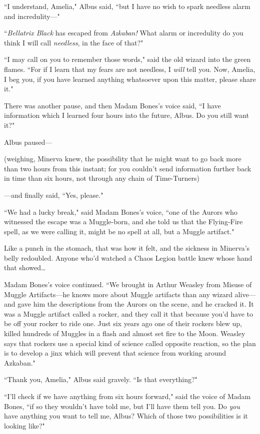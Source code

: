 ``I understand, Amelia," Albus said, ``but I have no wish to spark needless alarm and incredulity---"

``\emph{Bellatrix Black} has escaped from \emph{Azkaban!} What alarm or incredulity do you think I will call \emph{needless}, in the face of that?"

``I may call on you to remember those words," said the old wizard into the green flames. ``For if I learn that my fears are not needless, I \emph{will} tell you. Now, Amelia, I beg you, if you have learned anything whatsoever upon this matter, please share it."

There was another pause, and then Madam Bones's voice said, ``I have information which I learned four hours into the future, Albus. Do you still want it?"

Albus paused---

(weighing, Minerva knew, the possibility that he might want to go back more than two hours from this instant; for you couldn't send information further back in time than six hours, not through any chain of Time-Turners)

---and finally said, ``Yes, please."

``We had a lucky break," said Madam Bones's voice, ``one of the Aurors who witnessed the escape was a Muggle-born, and she told us that the Flying-Fire spell, as we were calling it, might be no spell at all, but a Muggle artifact."

Like a punch in the stomach, that was how it felt, and the sickness in Minerva's belly redoubled. Anyone who'd watched a Chaos Legion battle knew whose hand that showed{\ldots}

Madam Bones's voice continued. ``We brought in Arthur Weasley from Misuse of Muggle Artifacts---he knows more about Muggle artifacts than any wizard alive---and gave him the descriptions from the Aurors on the scene, and he cracked it. It was a Muggle artifact called a rocker, and they call it that because you'd have to be off your rocker to ride one. Just six years ago one of their rockers blew up, killed hundreds of Muggles in a flash and almost set fire to the Moon. Weasley says that rockers use a special kind of science called opposite reaction, so the plan is to develop a jinx which will prevent that science from working around Azkaban."

``Thank you, Amelia," Albus said gravely. ``Is that everything?"

``I'll check if we have anything from six hours forward," said the voice of Madam Bones, ``if so they wouldn't have told me, but I'll have them tell you. Do \emph{you} have anything you want to tell me, Albus? Which of those two possibilities is it looking like?"

